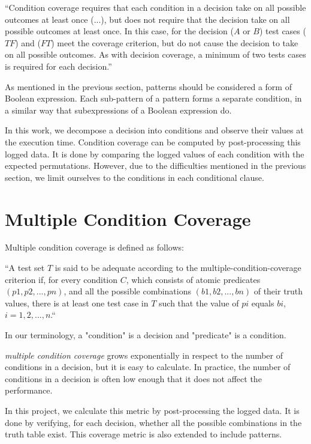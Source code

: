\documentclass[12pt,a4paper]{report}
\begin{document}
“Condition coverage requires that each condition in a decision take on all possible outcomes at least once (...), but does not require that the decision take on all possible outcomes at least once. In this case, for the decision ($A$ or $B$) test cases ($TF$) and ($FT$) meet the coverage criterion, but do not cause the decision to take on all possible outcomes. As with decision coverage, a minimum of two tests cases is required for each decision.”\cite{KellyJ.:2001:PTM:886632}

As mentioned in the previous section, patterns should be considered a form of Boolean expression. Each sub-pattern of a pattern forms a separate condition, in a similar way that subexpressions of a Boolean expression do. 

In this work, we decompose a decision into conditions and observe their values at the execution time. Condition coverage can be computed by post-processing this logged data. It is done by comparing the logged values of each condition with the expected permutations. However, due to the difficulties mentioned in the previous section, we limit ourselves to the conditions in each conditional clause. 

\section{Multiple Condition Coverage}
Multiple condition coverage is defined as follows:

“A test set $T$ is said to be adequate according to the multiple-condition-coverage criterion if, for every condition $C$, which consists of atomic predicates $(p1, p2,  . . .  , pn)$, and all the possible combinations $(b1, b2,  . . .  , bn)$ of their truth values, there is at least one test case in $T$ such that the value of $pi$ equals $bi$, $i = 1, 2,  .  .  .  , n$.“ \cite{Zhu:1997:SUT:267580.267590}

In our terminology, a "condition" is a decision and "predicate" is a condition. 

\emph{multiple condition coverage} grows exponentially in respect to the number of conditions in a decision, but it is easy to calculate. In practice, the number of conditions in a decision is often low enough that it does not affect the performance.

In this project, we calculate this metric by post-processing the logged data. It is done by verifying, for each decision, whether all the possible combinations in the truth table exist. This coverage metric is also extended to include patterns.
\end{document}
